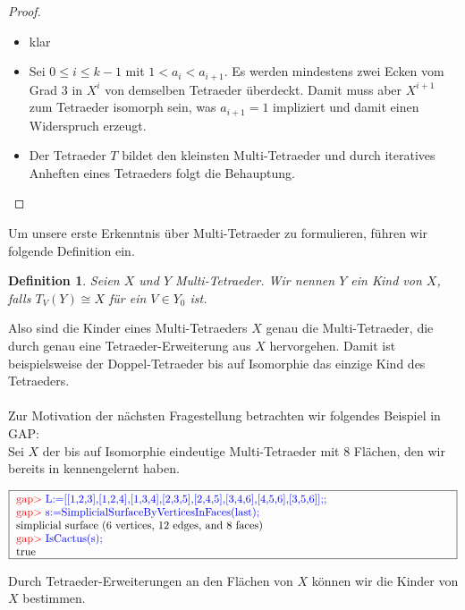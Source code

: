 \documentclass[12pt,titlepage,twoside,cleardoublepage]{article}
\theoremstyle{nummermitklammern}
\newtheorem{definition}[temp]{Definition}
\newtheorem{definition}[zahl]{Definition}
\numberwithin{equation}{section}
\begin{document}
\begin{proof}
\begin{itemize}
\item klar
\item Sei $0\leq i \leq k-1$ mit $1<a_i <a_{i+1}.$ Es werden mindestens zwei Ecken vom Grad 3 in $X^{i}$ von demselben Tetraeder überdeckt. Damit muss aber $X^{i+1}$ zum Tetraeder isomorph sein, was $a_{i+1}=1$ impliziert und damit einen Widerspruch erzeugt.
 \item Der Tetraeder $T$ bildet den kleinsten Multi-Tetraeder  und durch iteratives Anheften eines Tetraeders folgt die Behauptung.
\end{itemize}
\end{proof}

Um unsere erste Erkenntnis über Multi-Tetraeder zu formulieren, führen wir folgende Definition ein.
\begin{definition}
Seien $X$ und $Y$ Multi-Tetraeder. Wir nennen $Y$ ein Kind von $X$, falls $T_V(Y)\cong X$ für ein $V\in Y_0$ ist.
\end{definition}
Also sind die Kinder eines Multi-Tetraeders $X$ genau die Multi-Tetraeder, die durch genau eine Tetraeder-Erweiterung aus $X$ hervorgehen.
Damit ist beispielsweise der Doppel-Tetraeder bis auf Isomorphie das einzige Kind des Tetraeders. \\\\
Zur Motivation der nächsten Fragestellung betrachten wir folgendes Beispiel in GAP:\\
Sei $X$ der bis auf Isomorphie eindeutige Multi-Tetraeder mit 8 Flächen, den wir bereits in  kennengelernt haben. 
\begin{center}
$\fbox{
\parbox{14cm}{
\textcolor{red}{gap$>$} \textcolor{blue}{L:=[[1,2,3],[1,2,4],[1,3,4],[2,3,5],[2,4,5],[3,4,6],[4,5,6],[3,5,6]];;}\newline
\textcolor{red}{gap$>$} \textcolor{blue}{s:=SimplicialSurfaceByVerticesInFaces(last);}\newline
simplicial surface (6 vertices, 12 edges, and 8 faces)\newline
\textcolor{red}{gap$>$} \textcolor{blue}{IsCactus(s);}\newline
true
}}$
\end{center}
Durch Tetraeder-Erweiterungen an den Flächen von $X$ können wir die Kinder von $X$ bestimmen.
\end{document}
